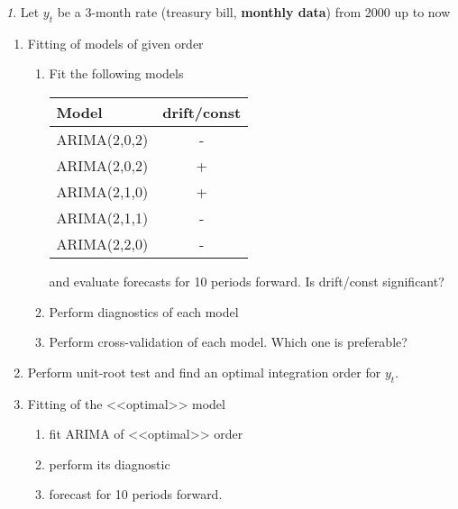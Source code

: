 \documentclass[12pt]{article}
\theoremstyle{remark}
\newtheorem{exercise}{}[section]
\begin{document}
\begin{exercise}
Let \(y_t\) be a 3-month rate (treasury bill,  \textbf{monthly data}) from 2000 up to now
\begin{enumerate}
	\item Fitting of models of given order
	\begin{enumerate}
		\item Fit the following models
		\begin{center}\small
			\begin{tabular}{l|c}
				Model & drift/const \\ \hline
				ARIMA(2,0,2) & - \\
				ARIMA(2,0,2) & + \\
				ARIMA(2,1,0) & + \\
				ARIMA(2,1,1) & - \\
				ARIMA(2,2,0) & - \\ \hline
			\end{tabular}
		\end{center} 
		and evaluate forecasts for 10 periods forward. Is drift/const significant?
		\item Perform diagnostics of each model
		\item Perform cross-validation of each model. Which one is preferable?
	\end{enumerate}
	\item Perform unit-root test and find an optimal integration order for  \(y_t\). 
	\item Fitting of the <<optimal>> model
	\begin{enumerate}
		\item fit ARIMA of <<optimal>> order
		\item perform its diagnostic
		\item forecast for 10 periods forward.
	\end{enumerate}
\end{enumerate}
\end{exercise}
\end{document}
